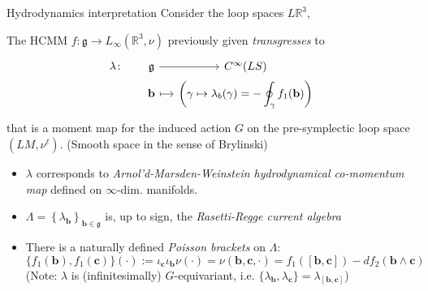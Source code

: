 \documentclass[beamer,10pt]{standalone}
\begin{document}
\begin{frame}[fragile]{Hydrodynamics interpretation}\label{frame:hydrointerpretation}
		Consider the loop spaces $L{\mathbb R}^3$,\\
		\begin{propblock}
			The HCMM $f \colon \mathfrak{g} \to L_{\infty}(\mathbb{R}^3,\nu)$ previously given
			\emph{transgresses}	 to
			\begin{displaymath}%
				\begin{tikzcd}[column sep= small,row sep=0ex]
					\lambda \colon& \mathfrak{g}	\arrow[r]& C^\infty(LS) \\
					& {\mathbf b}	\arrow[r, mapsto]
					& \displaystyle \biggr( \gamma \mapsto \lambda_b(\gamma) = - \oint_{\gamma} f_1({\mathbf b})  \biggr)	
				\end{tikzcd}	
			\end{displaymath}
			that is a  moment map for the induced action $G$ on the pre-symplectic loop space $(LM,\nu^{\ell})$. (Smooth space in the sense of Brylinski)
		\end{propblock}
		\begin{itemize}
			\item $\lambda$ corresponds to \emph{Arnol'd-Marsden-Weinstein hydrodynamical co-momentum map}  defined on $\infty$-dim. manifolds.
			\item<2-> $\Lambda = \left\lbrace \lambda_{\mathbf b} \right\rbrace_{{\mathbf b}\in\mathfrak{g}}$ is, up to sign, the {\it Rasetti-Regge current algebra}
			\item<3-> There is a naturally defined {\it Poisson brackets} on $\Lambda$:
				\begin{displaymath}
					\{ f_1({\mathbf b}), f_1({\mathbf c}) \} (\cdot):= \iota_{\mathbf c} \iota_{\mathbf b} \nu (\cdot)=
						\nu({\mathbf b}, {\mathbf c}, \cdot) = f_1([{\mathbf b},{\mathbf c}])
					-df_2 ({\mathbf b} \wedge {\mathbf c})
				\end{displaymath}
				\centering\footnotesize(Note: $\lambda$ is (infinitesimally) $G$-equivariant, i.e. $	\{\lambda_{\mathbf b}, \lambda_{\mathbf c} \} = \lambda_{[{\mathbf b}, {\mathbf c}]}$)
		\end{itemize}

    
\end{frame}
\end{document}
